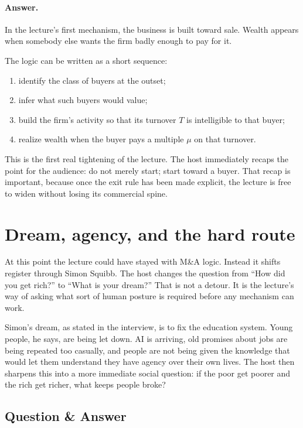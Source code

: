 \paragraph{Answer.} In the lecture's first mechanism, the business is built toward sale. Wealth appears when somebody else wants the firm badly enough to pay for it.

The logic can be written as a short sequence:
\begin{enumerate}
\item identify the class of buyers at the outset;
\item infer what such buyers would value;
\item build the firm's activity so that its turnover \(T\) is intelligible to that buyer;
\item realize wealth when the buyer pays a multiple \(\mu\) on that turnover.
\end{enumerate}

This is the first real tightening of the lecture. The host immediately recaps the point for the audience: do not merely start; start toward a buyer. That recap is important, because once the exit rule has been made explicit, the lecture is free to widen without losing its commercial spine.

\section{Dream, agency, and the hard route}

At this point the lecture could have stayed with M\&A logic. Instead it shifts register through Simon Squibb. The host changes the question from ``How did you get rich?'' to ``What is your dream?'' That is not a detour. It is the lecture's way of asking what sort of human posture is required before any mechanism can work.

Simon's dream, as stated in the interview, is to fix the education system. Young people, he says, are being let down. AI is arriving, old promises about jobs are being repeated too casually, and people are not being given the knowledge that would let them understand they have agency over their own lives. The host then sharpens this into a more immediate social question: if the poor get poorer and the rich get richer, what keeps people broke?

\subsection{Question \& Answer}

